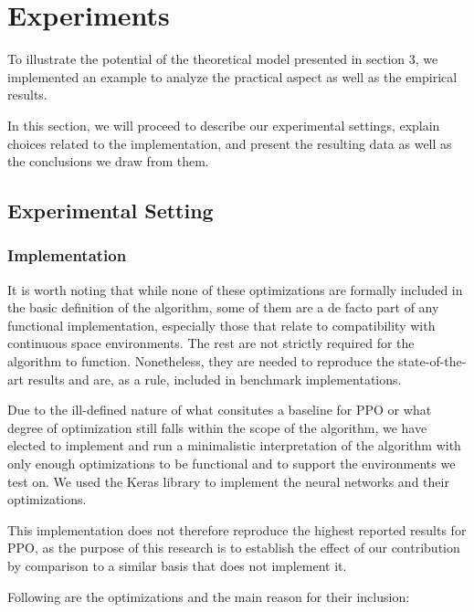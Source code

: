 \section{Experiments}
\label{sec:exp}
	To illustrate the potential of the theoretical model presented in section 3, we implemented an example to analyze the practical aspect as well as the empirical results.

In this section, we will proceed to describe our experimental settings, explain choices related to the implementation, and present the resulting data as well as the conclusions we draw from them.

\subsection{Experimental Setting}

\subsubsection{Implementation}

\cite{shengyi2022the37implementation}

It is worth  noting that while none of these optimizations are formally included in the basic definition of the algorithm, some of them are a de facto part of any functional implementation, especially those that relate to compatibility with  continuous space environments. The rest are not strictly required for the algorithm to function. Nonetheless, they are needed to reproduce the state-of-the-art results and are, as a rule, included in benchmark implementations. %

Due to the ill-defined nature of what consitutes a baseline for PPO or what degree of optimization still falls within the scope of the algorithm, we have elected to implement and run a minimalistic interpretation of the algorithm with only enough optimizations to be functional and to support the environments we test on. We used the Keras library to implement the neural networks and their optimizations.

This implementation does not therefore reproduce the highest reported results for PPO, as the purpose of this research is to establish the effect of our contribution by comparison to a similar basis that does not implement it.

Following are the optimizations and the main reason for their inclusion:

